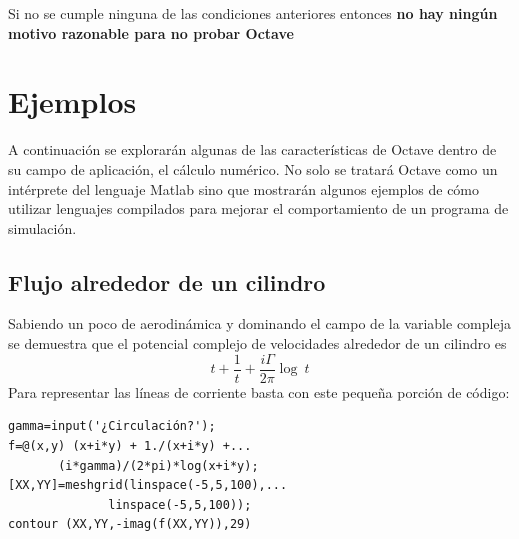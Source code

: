 \documentclass[10pt,letterpaper,conference]{ieeeconfspanish}
\begin{document}
Si no se cumple ninguna de las condiciones anteriores entonces \textbf{no
hay ningún motivo razonable para no probar Octave}



\hypertarget{ejemplos}{}
\section*{Ejemplos}

A continuación se explorarán algunas de las características de Octave
dentro de su campo de aplicación, el cálculo numérico.  No solo se
tratará Octave como un intérprete del lenguaje Matlab sino que
mostrarán algunos ejemplos de cómo utilizar lenguajes compilados para
mejorar el comportamiento de un programa de simulación.



\hypertarget{flujo-alrededor-de-un-cilindro}{}
\subsection*{Flujo alrededor de un cilindro}

Sabiendo un poco de aerodinámica y dominando el campo de la variable
compleja se demuestra que el potencial complejo de velocidades
alrededor de un cilindro es
\[ t + \frac{1}{t} + \frac{i\Gamma}{2 \pi}\log\ t \]
Para representar las líneas de corriente basta con este pequeña
porción de código:
\begin{verbatim}
gamma=input('¿Circulación?');
f=@(x,y) (x+i*y) + 1./(x+i*y) +...
       (i*gamma)/(2*pi)*log(x+i*y);
[XX,YY]=meshgrid(linspace(-5,5,100),...
              linspace(-5,5,100));
contour (XX,YY,-imag(f(XX,YY)),29)
\end{verbatim}
\end{document}
